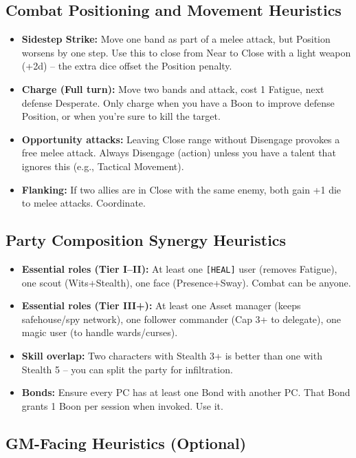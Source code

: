 \documentclass[11pt]{article}
\begin{document}
\subsection*{Combat Positioning and Movement Heuristics}

\begin{itemize}
    \item \textbf{Sidestep Strike:} Move one band as part of a melee attack, but Position worsens by one step. Use this to close from Near to Close with a light weapon (+2d) -- the extra dice offset the Position penalty.
    \item \textbf{Charge (Full turn):} Move two bands and attack, cost 1 Fatigue, next defense Desperate. Only charge when you have a Boon to improve defense Position, or when you're sure to kill the target.
    \item \textbf{Opportunity attacks:} Leaving Close range without Disengage provokes a free melee attack. Always Disengage (action) unless you have a talent that ignores this (e.g., Tactical Movement).
    \item \textbf{Flanking:} If two allies are in Close with the same enemy, both gain +1 die to melee attacks. Coordinate.
\end{itemize}

\subsection*{Party Composition Synergy Heuristics}

\begin{itemize}
    \item \textbf{Essential roles (Tier I--II):} At least one \texttt{[HEAL]} user (removes Fatigue), one scout (Wits+Stealth), one face (Presence+Sway). Combat can be anyone.
    \item \textbf{Essential roles (Tier III+):} At least one Asset manager (keeps safehouse/spy network), one follower commander (Cap 3+ to delegate), one magic user (to handle wards/curses).
    \item \textbf{Skill overlap:} Two characters with Stealth 3+ is better than one with Stealth 5 -- you can split the party for infiltration.
    \item \textbf{Bonds:} Ensure every PC has at least one Bond with another PC. That Bond grants 1 Boon per session when invoked. Use it.
\end{itemize}

\subsection*{GM-Facing Heuristics (Optional)}
\end{document}
